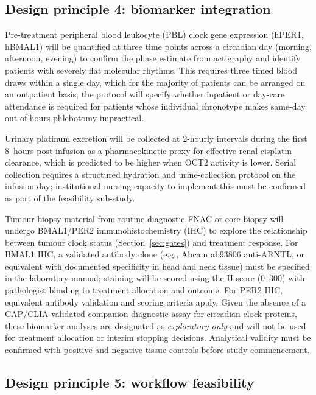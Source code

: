 \documentclass[preprint,review,12pt]{elsarticle}
\begin{document}
\subsection{Design principle 4: biomarker integration}

Pre-treatment peripheral blood leukocyte (PBL) clock gene expression
(hPER1, hBMAL1) will be quantified at three time points across a
circadian day (morning, afternoon, evening) to confirm the phase estimate
from actigraphy and identify patients with severely flat molecular rhythms.
This requires three timed blood draws within a single day, which for
the majority of patients can be arranged on an outpatient basis; the
protocol will specify whether inpatient or day-care attendance is
required for patients whose individual chronotype makes same-day
out-of-hours phlebotomy impractical.

Urinary platinum excretion will be collected at 2-hourly intervals
during the first 8~hours post-infusion as a pharmacokinetic proxy
for effective renal cisplatin clearance, which is predicted to
be higher when OCT2 activity is lower.  Serial collection requires a
structured hydration and urine-collection protocol on the infusion day;
institutional nursing capacity to implement this must be confirmed as
part of the feasibility sub-study.

Tumour biopsy material from routine diagnostic FNAC or core biopsy
will undergo BMAL1/PER2 immunohistochemistry (IHC) to explore the
relationship between tumour clock status (Section~\ref{sec:gates})
and treatment response.  For BMAL1 IHC, a validated antibody clone
(e.g., Abcam ab93806 anti-ARNTL, or equivalent with documented
specificity in head and neck tissue) must be specified in the laboratory
manual; staining will be scored using the H-score (0--300) with
pathologist blinding to treatment allocation and outcome.  For PER2 IHC,
equivalent antibody validation and scoring criteria apply.  Given the
absence of a CAP/CLIA-validated companion diagnostic assay for circadian
clock proteins, these biomarker analyses are designated as \emph{exploratory
only} and will not be used for treatment allocation or interim stopping
decisions.  Analytical validity must be confirmed with positive and negative
tissue controls before study commencement.

\subsection{Design principle 5: workflow feasibility}
\end{document}
